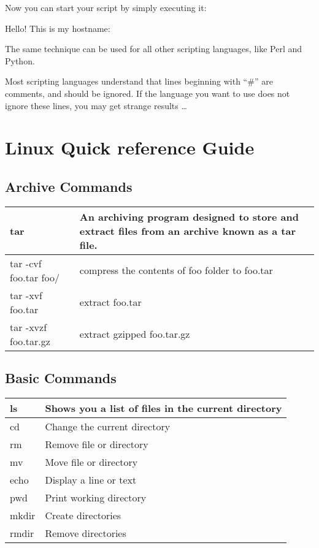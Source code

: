 \begin{prompt}
\end{prompt}

Now you can start your script by simply executing it:

\begin{prompt}
Hello! This is my hostname:
\end{prompt}

The same technique can be used for all other scripting languages, like Perl and Python.

Most scripting languages understand that lines beginning with ``\#'' are
comments, and should be ignored. If the language you want to use does not
ignore these lines, you may get strange results \ldots

\section{Linux Quick reference Guide}

\subsection{Archive Commands}

\begin{tabular}{|p{}|p{}|} \hline
tar                   & An archiving program designed to store and extract files from an archive known as a tar file.  \\ \hline
tar -cvf foo.tar foo/ & compress the contents of foo folder to foo.tar \\ \hline
tar -xvf foo.tar      & extract foo.tar \\ \hline
tar -xvzf foo.tar.gz  & extract gzipped foo.tar.gz \\ \hline
\end{tabular}


\subsection{Basic Commands}

\begin{tabular}{|p{}|p{}|} \hline
ls     & Shows you a list of files in the current directory \\ \hline
cd     & Change the current directory \\ \hline
rm     & Remove file or directory \\ \hline
mv     & Move file or directory \\ \hline
echo   & Display a line or text \\ \hline
pwd    & Print working directory \\ \hline
mkdir  & Create directories \\ \hline
rmdir  & Remove directories \\ \hline
\end{tabular}


